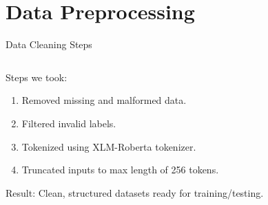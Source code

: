 \documentclass[aspectratio=169]{beamer}
\begin{document}
\section{Data Preprocessing}
\begin{frame}{Data Cleaning Steps}
  \begin{columns}[T]
    \begin{column}{0.5\textwidth}
      Steps we took:
      \begin{enumerate}
        \item Removed missing and malformed data.
        \item Filtered invalid labels.
        \item Tokenized using XLM-Roberta tokenizer.
        \item Truncated inputs to max length of 256 tokens.
      \end{enumerate}
      Result: Clean, structured datasets ready for training/testing.
    \end{column}


\end{columns}
\end{frame}
\end{document}
